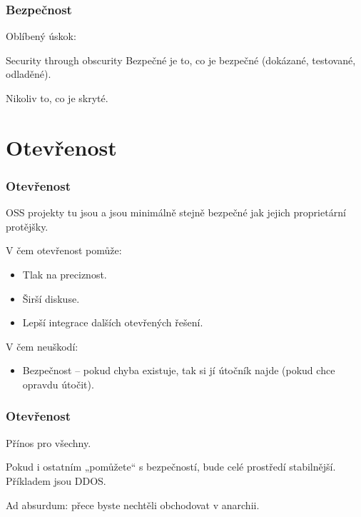 \documentclass[xetex]{beamer}
\begin{document}
\begin{frame}
	\frametitle{Bezpečnost}

	Oblíbený úskok:

	\bigskip

	\begin{block}{Security through obscurity}
	Bezpečné je to, co je bezpečné (dokázané, testované, odladěné).

	\medskip

	Nikoliv to, co je skryté.
	\end{block}
\end{frame}

\section{Otevřenost}

\begin{frame}
	\frametitle{Otevřenost}
	OSS projekty tu jsou a jsou minimálně stejně bezpečné jak jejich proprietární protějšky.

	\bigskip

	V čem otevřenost pomůže:
	\begin{itemize}
		\item Tlak na preciznost.
		\item Širší diskuse.
		\item Lepší integrace dalších otevřených řešení.
	\end{itemize}

	\bigskip

	V čem neuškodí:
	\begin{itemize}
		\item Bezpečnost – pokud chyba existuje, tak si jí útočník najde (pokud chce opravdu útočit).
	\end{itemize}
\end{frame}

\begin{frame}
	\frametitle{Otevřenost}
	Přínos pro všechny.

	\bigskip

	Pokud i ostatním „pomůžete“ s bezpečností, bude celé prostředí stabilnější. 
	Příkladem jsou DDOS.

	\medskip

	Ad absurdum: přece byste nechtěli obchodovat v anarchii.
\end{frame}
\end{document}

